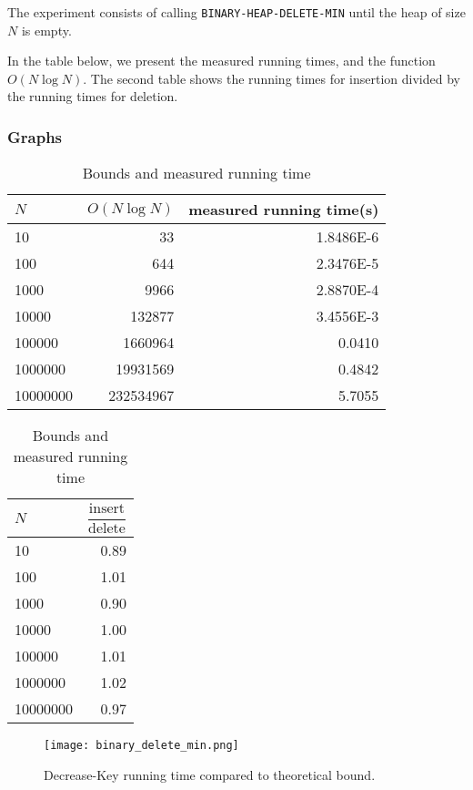 \documentclass[a4paper,oneside,11pt]{article}
\begin{document}
\begin{itemize}
The experiment consists of calling \texttt{BINARY-HEAP-DELETE-MIN} until the heap of size $N$ is empty.

In the table below, we present the measured running times, and the function $O(N\log N)$. The second table shows the running times for insertion divided by the running times for deletion.
\subsubsection*{Graphs}
\begin{table}
  \begin{center}
    \begin{tabular}{l|r|r}
      $N$ & $O(N\log N)$ & measured running time(s)\\
      \hline
      10       & 33         & \num{1.8486E-6}\\
      100      & 644        & \num{2.3476E-5}\\
      1000     & 9966       & \num{2.8870E-4}\\
      10000    & 132877     & \num{3.4556E-3}\\
      100000   & 1660964    & \num{0.0410}\\
      1000000  & 19931569   & \num{0.4842}\\
      10000000 & 232534967  & \num{5.7055}
    \end{tabular}
    \caption{Bounds and measured running time}
  \end{center}
\end{table}

\begin{table}
  \begin{center}
    \begin{tabular}{l|r}
      $N$ & $\dfrac{\text{insert}}{\text{delete}}$\\
      \hline
      10       & \num{0.89}\\
      100      & \num{1.01}\\
      1000     & \num{0.90}\\
      10000    & \num{1.00}\\
      100000   & \num{1.01}\\
      1000000  & \num{1.02}\\
      10000000 & \num{0.97}
    \end{tabular}
    \caption{Bounds and measured running time}
  \end{center}
\end{table}
\begin{figure}
    \texttt{[image: binary\_delete\_min.png]}
    \caption{Decrease-Key running time compared to theoretical bound.}
\end{figure}


\end{itemize}
\end{document}
